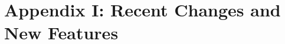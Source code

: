 \documentclass[12pt,twoside]{article}
\newcommand{\mylink}[2]{%
\latexhtml{\hyperlink{#1}{#2}}{\hyperref{#2}{}{}{#1}}}
\newcommand{\mylinkext}[2]{%
\latexhtml{\htmlref{#2}{#1}}{\hyperref{#2}{}{}{#1}}}
\begin{document}
\begin{itemize}
%
%
\end{itemize}


\vfill\newpage
\section{Appendix I: Recent Changes and New Features}
\label{sec:newfeatures}
\end{document}
